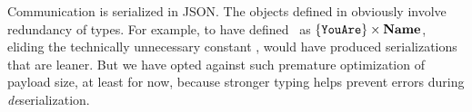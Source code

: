 
Communication is serialized in JSON\@. The objects defined
in  obviously involve redundancy of types. For
example, to have defined \youarevalset\ as
$\{ \texttt{YouAre} \} \times \textbf{Name} $, eliding the technically
unnecessary constant \charnametg, would have produced serializations
that are leaner. But we have opted against such premature optimization
of payload size, at least for now, because stronger typing helps
prevent errors during {\em de}serialization.

